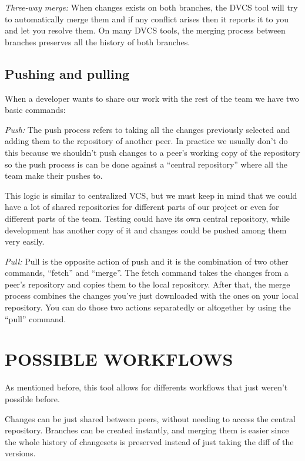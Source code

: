\documentclass[a4paper,10pt]{article}
\begin{document}
\emph{Three-way merge:} When changes exists on both branches, the DVCS tool will try to automatically merge them and if any conflict arises then it reports it to you and let you resolve them. 
On many DVCS tools, the merging process\cite{svnmerging} between branches preserves all the history of 
both branches.

\subsection{Pushing and pulling}
When a developer wants to share our work with the rest of the team we have two basic commands:

\emph{Push:}
The push process refers to taking all the changes previously selected and adding them to the repository of another peer. In practice we usually don't do this because we shouldn't push changes to a peer's working copy of the repository so the push process is can be done against a ``central repository'' where all the team make their pushes to.

This logic is similar to centralized VCS, but we must keep in mind that we could have a lot of shared repositories for different parts of our project or even for different parts of the team. Testing could have its own central repository, while development has another copy of it and changes could be pushed among them very easily.

\emph{Pull:} 
Pull is the opposite action of push and it is the combination of two other commands, ``fetch'' and ``merge''. The fetch command takes the changes from a peer's repository and copies them to the local repository. After that, the merge process combines the changes you've just downloaded with the ones on your local repository. You can do those two actions separatedly or altogether by using the ``pull'' command.



\section{POSSIBLE WORKFLOWS}
\label{WORKFLOWS}

As mentioned before, this tool allows for differents workflows that just weren't 
possible before.

Changes can be just shared between peers, without needing to access the central 
repository. Branches can be created instantly, and merging them is easier since 
the whole history of changesets is preserved instead of just taking the diff of 
the versions.
\end{document}
